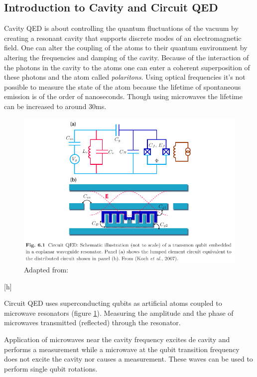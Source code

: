 \documentclass[12pt]{article}
\numberwithin{equation}{subsection}
\newcommand\page[1]{
{
}
}
\begin{document}
\page{71}
\subsection{Introduction to Cavity and Circuit QED}
Cavity QED is about controlling the quantum fluctuations of the vacuum by creating a resonant cavity that supports discrete modes of an electromagnetic field.
One can alter the coupling of the atoms to their quantum environment by altering the frequencies and damping of the cavity. 
Because of the interaction of the photons in the cavity to the atoms one can enter a coherent superposition of these photons and the atom called \emph{polaritons}.
Using optical frequencies it's not possible to measure the state of the atom because the lifetime of spontaneous emission is of the order of nanoseconds. Though using microwaves the lifetime can be increased to around 30ms.

\begin{figure}[h]
\includegraphics[scale=0.5]{images/73-circuit-qed.png}
\caption{Adapted from: \cite{Girvin2015CircuitQS}}
\label{73-circuit-qed}
\end{figure}[h]


Circuit QED uses superconducting qubits as artificial atoms coupled to microwave resonators (figure  \ref{73-circuit-qed}). Measuring the amplitude and the phase of microwaves transmitted (reflected) through the resonator.

\page{72}
Application of microwaves near the cavity frequency excites de cavity and performs a measurement while a microwave at the qubit transition frequency does not excite the cavity nor causes a measurement. These waves can be used to perform single qubit rotations.
\end{document}
